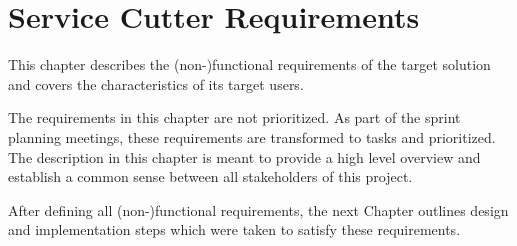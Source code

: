 
\chapter{Service Cutter Requirements}
\label{cha:requirements}


This chapter describes the (non-)functional requirements of the target solution and covers the characteristics of its target users. 

The requirements in this chapter are not prioritized. As part of the sprint planning meetings, these requirements are transformed to tasks and prioritized. The description in this chapter is meant to provide a high level overview and establish a common sense between all stakeholders of this project.







\bigskip

After defining all (non-)functional requirements, the next Chapter outlines design and implementation steps which were taken to satisfy these requirements.

